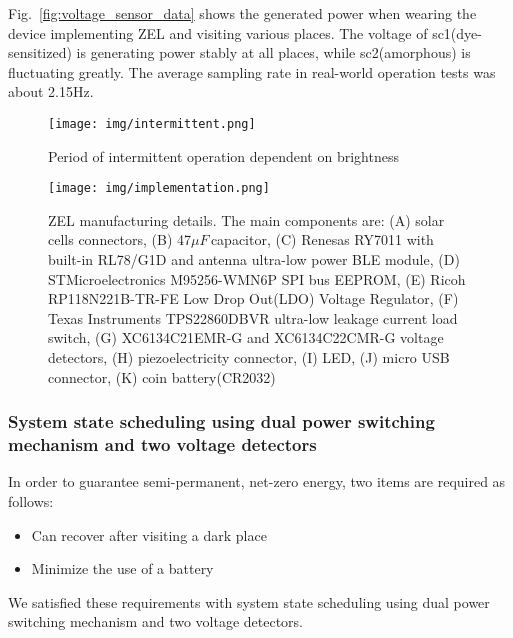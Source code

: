 \documentclass[conference]{IEEEtran}
\begin{document}


Fig.~\ref{fig:voltage_sensor_data} shows the generated power when wearing the device implementing ZEL and visiting various places.
The voltage of sc1(dye-sensitized) is generating power stably at all places, while sc2(amorphous) is fluctuating greatly.
The average sampling rate in real-world operation tests was about 2.15Hz.

\begin{figure}[bt]
    \centering
    \texttt{[image: img/intermittent.png]}
    \caption{Period of intermittent operation dependent on brightness}
    \label{fig:intermittent}
\end{figure}

\begin{figure*}[t]
    \centering
    \texttt{[image: img/implementation.png]}
    \caption{ZEL manufacturing details. The main components are: (A) solar cells connectors, (B) 47$\mu F\,$capacitor, (C) Renesas RY7011 with built-in RL78/G1D and antenna ultra-low power BLE module, (D) STMicroelectronics M95256-WMN6P SPI bus EEPROM, (E) Ricoh RP118N221B-TR-FE Low Drop Out(LDO) Voltage Regulator, (F) Texas Instruments TPS22860DBVR ultra-low leakage current load switch, (G) XC6134C21EMR-G and XC6134C22CMR-G voltage detectors, (H) piezoelectricity connector, (I) LED, (J) micro USB connector, (K) coin battery(CR2032)}
    \label{fig:circuit}
\end{figure*}

\subsubsection{System state scheduling using dual power switching mechanism and two voltage detectors}
In order to guarantee semi-permanent, net-zero energy, two items are required as follows:
\begin{itemize}
    \item Can recover after visiting a dark place
    \item Minimize the use of a battery
\end{itemize}
We satisfied these requirements with system state scheduling using dual power switching mechanism and two voltage detectors.
\end{document}
